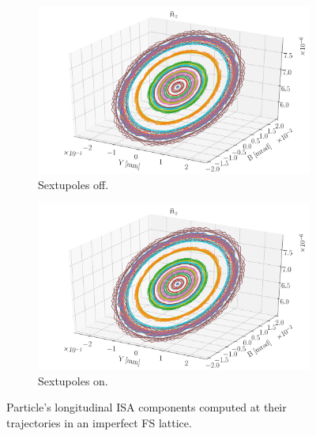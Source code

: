\begin{figure}[!h]
	\centering
	\begin{subfigure}{\linewidth}
		\includegraphics[width=\linewidth]{images/decoh_sim/NZ_VS_YB_IMPERFECT_UNOPT}
		\caption{Sextupoles off.}
	\end{subfigure}
	\begin{subfigure}{\linewidth}
		\includegraphics[width=\linewidth]{images/decoh_sim/NZ_VS_YB_IMPERFECT_OPTIM}
		\caption{Sextupoles on.}
	\end{subfigure}
	\caption{Particle's longitudinal ISA components computed at their trajectories
          in an imperfect FS lattice.\label{decoh:fig:NZ_on_traj}}
\end{figure}


